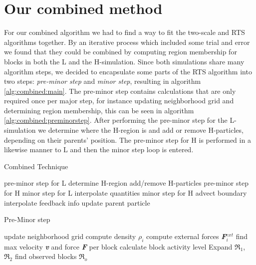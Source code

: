 \documentclass[../../main.tex]{subfiles}
\begin{document}
\tracingall

\section{Our combined method}

For our combined algorithm we had to find a way to fit the two-scale and RTS algorithms together. By an iterative process which included some trial and error we found that they could be combined by computing region membership for blocks in both the L and the H-simulation. Since both simulations share many algorithm steps, we decided to encapsulate some parts of the RTS algorithm into two steps: \textit{pre-minor step} and \textit{minor step}, resulting in algorithm \ref{alg:combined:main}. The pre-minor step contains calculations that are only required once per major step, for instance updating neighborhood grid and determining region membership, this can be seen in algorithm \ref{alg:combined:preminorstep}. After performing the pre-minor step for the L-simulation we determine where the H-region is and add or remove H-particles, depending on their parents' position. The pre-minor step for H is performed in a likewise manner to L and then the minor step loop is entered. 

\begin{algorithm}[h]
    \caption{Combined Technique}
    \label{alg:combined:main}
    \begin{algorithmic}[1]
            \State pre-minor step for L
            \State determine H-region
            \State add/remove H-particles
            \State pre-minor step for H
                \State minor step for L
                \State interpolate quantities
                  \State minor step for H
                  \State advect boundary
                \EndFor
            \State interpolate feedback info
            \EndFor
            \State update parent particle
        \EndWhile
   \end{algorithmic}
\end{algorithm}


\begin{algorithm}[h]
    \caption{Pre-Minor step}
    \label{alg:combined:preminorstep}
    \begin{algorithmic}[1]
    \State update neighborhood grid
        \State compute density $\rho_i$ 
    \EndFor
        \State compute external forces \textbf{\textit{F}}$^{ext}_i$
    \EndFor
    \State find max velocity \textbf{\textit{v}} and force \textbf{\textit{F}} per block
    \State calculate block activity level
    \State Expand $\Re_1$, $\Re_2$
    \State find observed blocks $\Re_o$
   \end{algorithmic}
\end{algorithm}
\end{document}
